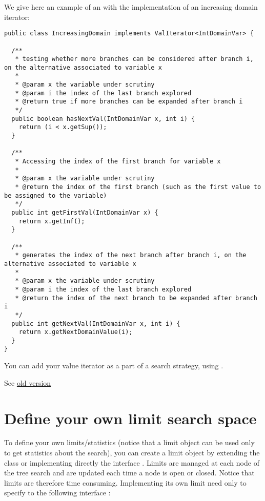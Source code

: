 We give here an example of an  with the implementation of an increasing domain iterator:
\begin{lstlisting}
public class IncreasingDomain implements ValIterator<IntDomainVar> {

  /**
   * testing whether more branches can be considered after branch i, on the alternative associated to variable x
   *
   * @param x the variable under scrutiny
   * @param i the index of the last branch explored
   * @return true if more branches can be expanded after branch i
   */
  public boolean hasNextVal(IntDomainVar x, int i) {
    return (i < x.getSup());
  }

  /**
   * Accessing the index of the first branch for variable x
   *
   * @param x the variable under scrutiny
   * @return the index of the first branch (such as the first value to be assigned to the variable)
   */
  public int getFirstVal(IntDomainVar x) {
    return x.getInf();
  }

  /**
   * generates the index of the next branch after branch i, on the alternative associated to variable x
   *
   * @param x the variable under scrutiny
   * @param i the index of the last branch explored
   * @return the index of the next branch to be expanded after branch i
   */
  public int getNextVal(IntDomainVar x, int i) {
    return x.getNextDomainValue(i);
  }
}
\end{lstlisting}

You can add your value iterator as a part of a search strategy, using .

 See \href{http://choco-solver.net/index.phptitle=userguide:beyondvariable.2fvalueselection.2chowtodefineyourownbranchingobject}{old version}

\section{Define your own limit search space}\label{advanced:defineyourownlimitsearchspace}\hypertarget{advanced:defineyourownlimitsearchspace}{}

To define your own limits/statistics (notice that a limit object can be used only to get statistics about the search), you can create a limit object by extending the  class or implementing directly the interface . Limits are managed at each node of the tree search and are updated each time a node is open or closed. Notice that limits are therefore time consuming. Implementing its own limit need only to specify to the following interface :

